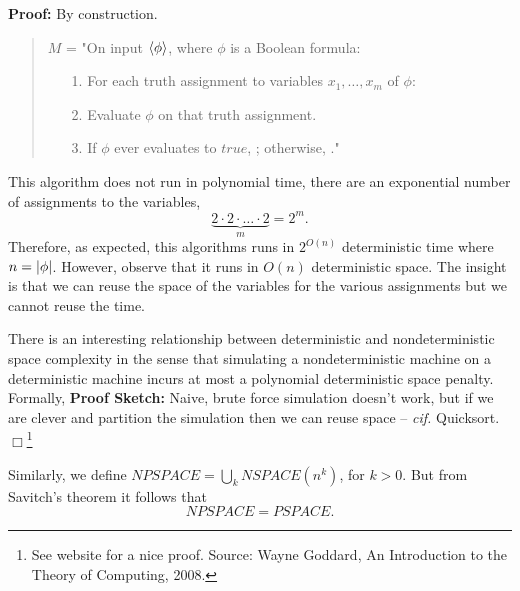 \documentclass[a4paper,blends,pdf,colorBG,slideColor]{prosper}
\begin{document}
{\small
{}
{\bf Proof:} By construction.
\begin{quote}
$M$ = "On input $\langle {\phi} \rangle$, where $\phi$ is a Boolean formula:
\begin{itemize}
\item[1.] For each truth assignment to variables $x_1,\ldots,x_m$ of $\phi$:
\item[2.]\mytab Evaluate $\phi$ on that truth assignment.
\item[3.] If $\phi$ ever evaluates to $true$, \accept; otherwise, \reject."
\end{itemize}
\end{quote}
}
This algorithm does not run in polynomial time, there are an exponential number of assignments to the variables,
\[
\underbrace{2\cdot 2\cdot\ldots\cdot 2}_m = 2^m.
\]
Therefore, as expected, this algorithms runs in $2^{O(n)}$ deterministic time where $n = {|{\phi}|}$.
However, observe that it runs in $O(n)$ deterministic space.  The insight is that we can reuse the space of the variables for the various assignments but we cannot reuse the time.
\es


There is an interesting relationship between deterministic and nondeterministic space complexity in the sense that simulating a nondeterministic machine on a deterministic machine incurs at most a polynomial deterministic space penalty.  Formally,
{\bf Proof Sketch:} Naive, brute force simulation doesn't work, but if we are clever and partition the simulation then we can reuse space -- {\em cif.} Quicksort. $\Box$\footnote{\scriptsize See website for a nice proof.  Source: Wayne Goddard, An Introduction to the Theory of Computing, 2008.}
\es



Similarly, we define $NPSPACE = \bigcup_k NSPACE(n^k)$, for $k > 0$.  But from Savitch's theorem it follows that
{\small
\[
NPSPACE = PSPACE.
\]
}
\es


\end{document}
